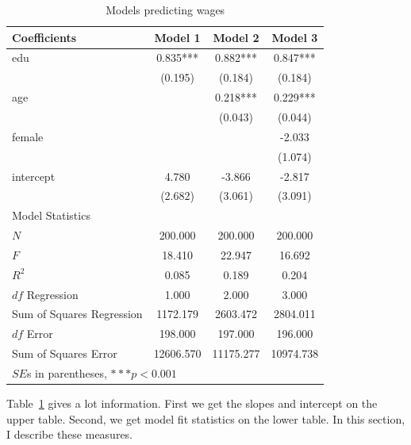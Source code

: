 \begin{table}[htbp]\centering
 \caption{Models predicting wages
\label{tab:wagereg_all}}
\begin{tabular}{lccc}
\hline
Coefficients  &   Model 1  &   Model 2  &   Model 3  \\ \hline
edu     &    0.835***&    0.882***&    0.847***\\
      &   (0.195)  &   (0.184)  &   (0.184)  \\
age     &        &    0.218***&    0.229***\\
      &        &   (0.043)  &   (0.044)  \\
female   &        &        &   -2.033  \\
      &        &        &   (1.074)  \\
intercept  &    4.780  &   -3.866  &   -2.817  \\
      &   (2.682)  &   (3.061)  &   (3.091)  \\
\hline
\multicolumn{4}{l}{Model Statistics} \\
\hline
$N$   &   200.000  &   200.000  &   200.000  \\
$F$    &   18.410  &   22.947  &   16.692  \\
$R^2$   &    0.085  &    0.189  &    0.204  \\
$df$ Regression    &    1.000  &    2.000  &    3.000  \\
Sum of Squares Regression  &  1172.179  &  2603.472  &  2804.011  \\
$df$ Error    &   198.000  &   197.000  &   196.000  \\
Sum of Squares Error   &  12606.570  &  11175.277  &  10974.738  \\
\hline
\multicolumn{4}{l}{$SE$s in parentheses, $***p<0.001$} \\
\hline
\end{tabular}
\end{table}
Table~\ref{tab:wagereg_all} gives a lot information. First we get the slopes and intercept on the upper table. Second, we get model fit statistics on the lower table. In this section, I describe these measures.
